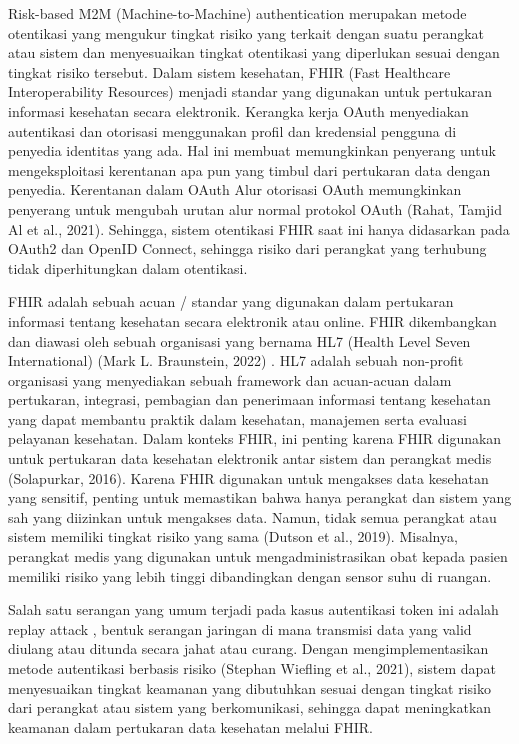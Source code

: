 Risk-based M2M (Machine-to-Machine) authentication merupakan metode otentikasi yang mengukur tingkat risiko yang terkait dengan suatu perangkat atau sistem dan menyesuaikan tingkat otentikasi yang diperlukan sesuai dengan tingkat risiko tersebut. Dalam sistem kesehatan, FHIR (Fast Healthcare Interoperability Resources) menjadi standar yang digunakan untuk pertukaran informasi kesehatan secara elektronik. Kerangka kerja OAuth menyediakan autentikasi dan otorisasi menggunakan profil dan kredensial pengguna di penyedia identitas yang ada. Hal ini membuat memungkinkan penyerang untuk mengeksploitasi kerentanan apa pun yang timbul dari pertukaran data dengan penyedia. Kerentanan dalam OAuth Alur otorisasi OAuth memungkinkan penyerang untuk mengubah urutan alur normal protokol OAuth (Rahat, Tamjid Al et al., 2021). Sehingga, sistem otentikasi FHIR saat ini hanya didasarkan pada OAuth2 dan OpenID Connect, sehingga risiko dari perangkat yang terhubung tidak diperhitungkan dalam otentikasi.

FHIR adalah sebuah acuan / standar yang digunakan dalam pertukaran informasi tentang kesehatan secara elektronik atau online. FHIR dikembangkan dan diawasi oleh sebuah organisasi yang bernama HL7 (Health Level Seven International) (Mark L. Braunstein, 2022) . HL7 adalah sebuah non-profit organisasi yang menyediakan sebuah framework dan acuan-acuan dalam pertukaran, integrasi, pembagian dan penerimaan informasi tentang kesehatan yang dapat membantu praktik dalam kesehatan, manajemen serta evaluasi pelayanan kesehatan. Dalam konteks FHIR, ini penting karena FHIR digunakan untuk pertukaran data kesehatan elektronik antar sistem dan perangkat medis (Solapurkar, 2016). Karena FHIR digunakan untuk mengakses data kesehatan yang sensitif, penting untuk memastikan bahwa hanya perangkat dan sistem yang sah yang diizinkan untuk mengakses data. Namun, tidak semua perangkat atau sistem memiliki tingkat risiko yang sama (Dutson et al., 2019). Misalnya, perangkat medis yang digunakan untuk mengadministrasikan obat kepada pasien memiliki risiko yang lebih tinggi dibandingkan dengan sensor suhu di ruangan.

Salah satu serangan yang umum terjadi pada kasus autentikasi token ini adalah replay attack , bentuk serangan jaringan di mana transmisi data yang valid diulang atau ditunda secara jahat atau curang. Dengan mengimplementasikan metode autentikasi berbasis risiko (Stephan Wiefling et al., 2021), sistem dapat menyesuaikan tingkat keamanan yang dibutuhkan sesuai dengan tingkat risiko dari perangkat atau sistem yang berkomunikasi, sehingga dapat meningkatkan keamanan dalam pertukaran data kesehatan melalui FHIR.